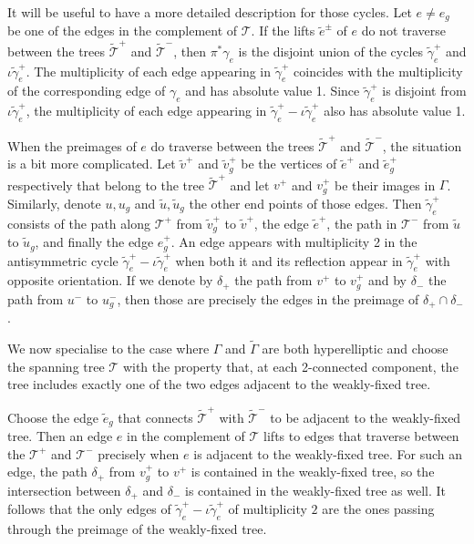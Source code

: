 \documentclass[11pt]{article}
\theoremstyle{definition}
\numberwithin{equation}{section}
\theoremstyle{definition}
\newcommand{\calT}{\mathcal{T}}
\newcommand{\wt}[1]{\widetilde{#1}}
\begin{document}
It will be useful to have a more detailed description for those cycles. Let $e\neq e_g$ be one of the  edges in the complement of $\calT$. If the lifts $\tilde e^{\pm}$ of $e$ do not traverse between the trees $\wt\calT^+$ and $\wt\calT^-$, then $\pi^{*}\gamma_e$ is the disjoint union of the cycles 
$\wt\gamma^+_e$ and $\iota\wt\gamma^+_e$. The multiplicity of each edge appearing in $\wt\gamma^+_e$ coincides with the multiplicity of the corresponding edge of $\gamma_e$ and has absolute value 1. 
Since $\wt\gamma^+_e$ is disjoint from $\iota\wt\gamma^+_e$, the multiplicity of each edge appearing in
$\wt\gamma^+_e - \iota\wt\gamma^+_e$ also has absolute value 1. 

When the preimages of $e$ do traverse between  the trees $\wt\calT^+$ and $\wt\calT^-$, the situation is a bit more complicated. Let $\tilde v^+$ and $\tilde v_g^+$ be the vertices of $\tilde e^+$ and $\tilde e_g^+$ respectively that belong to the tree $\wt\calT^+$ and let $v^+$ and $v_g^+$ be their images in $\Gamma$. Similarly, denote $u, u_g$ and $\tilde u, \tilde u_g$  the other end points of those edges. Then $\wt\gamma^+_e$ consists of the path along $\calT^+$ from $\tilde v_g^+$ to $\tilde v^+$, the edge $\tilde e^+$, the path in $\calT^-$ from $\tilde u$ to $\tilde u_g$, and finally the edge $e_g^+$. An edge appears with multiplicity 2 in  the antisymmetric cycle $\wt\gamma^+_e-\iota\wt\gamma^+_e$ when both it and its reflection appear in $\wt\gamma^+_e$ with opposite orientation. 
If we denote by $\delta_+$  the path from $v^+$ to $v_g^+$  and by $\delta_{-}$  the path from $u^-$ to $u_g^-$, then those are precisely the edges  in the preimage of $\delta_+\cap\delta_{-}$. 

We now specialise to the case where $\Gamma$ and $\wt\Gamma$ are both hyperelliptic  and choose the spanning tree $\calT$  with the property that, at each 2-connected component, the tree  includes exactly one of the two edges adjacent to the weakly-fixed tree.


Choose the edge $\tilde e_g$ that connects $\wt\calT^+$ with $\wt\calT^-$  to be adjacent to the weakly-fixed tree. Then an edge $e$ in the complement of $\calT$  lifts to edges that traverse between the $\calT^+$ and $\calT^-$ precisely when $e$ is adjacent to the weakly-fixed tree. For such an edge, the path $\delta_+$ from $v_g^+$ to $v^+$ is contained in the weakly-fixed tree, so  the intersection between $\delta_+$ and $\delta_-$ is contained in the weakly-fixed tree as well. It follows that the only edges of $\wt\gamma^+_e-\iota\wt\gamma^+_e$ of multiplicity $2$ are the ones passing through the preimage of the weakly-fixed tree. 
\end{document}
